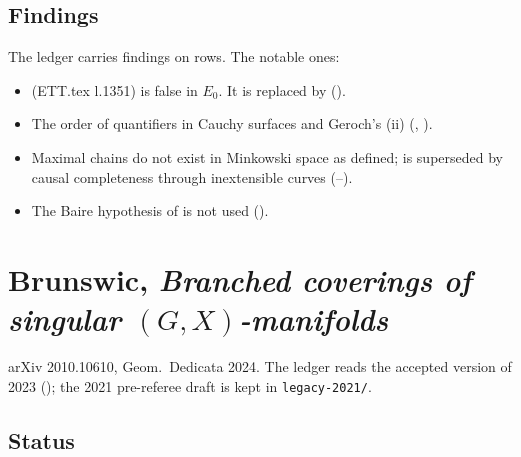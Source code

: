 \subsection{Findings}

The ledger carries \numEttFindings{} findings on \numEttFindingrows{} rows. The notable ones:
\begin{itemize}
\item {} (ETT.tex l.1351) is false in $E_0$. It is replaced by
   ().
\item The order of quantifiers in Cauchy surfaces and Geroch's (ii) (, ).
\item Maximal chains do not exist in Minkowski space as defined;  is
  superseded by causal completeness through inextensible curves (--).
\item The Baire hypothesis of  is not used ().
\end{itemize}

\section{Brunswic, \emph{Branched coverings of singular $(G,X)$-manifolds}}\label{sec:gx}

arXiv 2010.10610, Geom.\ Dedicata 2024. The ledger reads the accepted version of 2023
(); the 2021 pre-referee draft is kept in \texttt{legacy-2021/}.

\subsection{Status}

